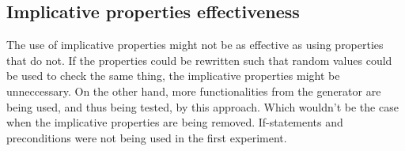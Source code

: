 \subsection*{Implicative properties effectiveness}
The use of implicative properties might not be as effective as using properties that do not. If the properties could be rewritten such that random values could be used to check the same thing, the implicative properties might be unneccessary. On the other hand, more functionalities from the generator are being used, and thus being tested, by this approach. Which wouldn't be the case when the implicative properties are being removed. If-statements and preconditions were not being used in the first experiment.

